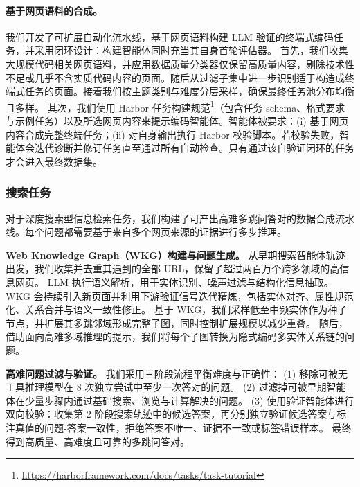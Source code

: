 \paragraph{基于网页语料的合成。}
我们开发了可扩展自动化流水线，基于网页语料构建 LLM 验证的终端式编码任务，并采用闭环设计：构建智能体同时充当其自身首轮评估器。
首先，我们收集大规模代码相关网页语料，并应用数据质量分类器仅保留高质量内容，剔除技术性不足或几乎不含实质代码内容的页面。随后从过滤子集中进一步识别适于构造成终端式任务的页面。接着我们按主题类别与难度分层采样，确保最终任务池分布均衡且多样。
其次，我们使用 Harbor 任务构建规范\footnote{\url{https://harborframework.com/docs/tasks/task-tutorial}}（包含任务 schema、格式要求与示例任务）以及所选网页内容来提示编码智能体。智能体被要求：(i) 基于网页内容合成完整终端任务；(ii) 对自身输出执行 Harbor 校验脚本。若校验失败，智能体会迭代诊断并修订任务直至通过所有自动检查。只有通过该自验证闭环的任务才会进入最终数据集。

\subsubsection{搜索任务}

对于深度搜索型信息检索任务，我们构建了可产出高难多跳问答对的数据合成流水线。每个问题都需要基于来自多个网页来源的证据进行多步推理。

\textbf{Web Knowledge Graph（WKG）构建与问题生成。}
从早期搜索智能体轨迹出发，我们收集并去重其遇到的全部 URL，保留了超过两百万个跨多领域的高信息网页。
LLM 执行语义解析，用于实体识别、噪声过滤与结构化信息抽取。
WKG 会持续引入新页面并利用下游验证信号迭代精炼，包括实体对齐、属性规范化、关系合并与语义一致性修正。
基于 WKG，我们采样低至中频实体作为种子节点，并扩展其多跳邻域形成完整子图，同时控制扩展规模以减少重叠。
随后，借助面向高难多域推理的提示，我们将每个子图转换为隐式编码多实体关系链的问题。

\textbf{高难问题过滤与验证。}
我们采用三阶段流程平衡难度与正确性：
(1) 移除可被无工具推理模型在 8 次独立尝试中至少一次答对的问题。
(2) 过滤掉可被早期智能体在少量步骤内通过基础搜索、浏览与计算解决的问题。
(3) 使用验证智能体进行双向校验：收集第 2 阶段搜索轨迹中的候选答案，再分别独立验证候选答案与标注真值的问题-答案一致性，拒绝答案不唯一、证据不一致或标签错误样本。
最终得到高质量、高难度且可靠的多跳问答对。

